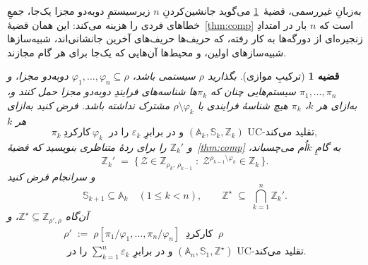 \documentclass[10pt,oneside,openany]{book}
\newcommand{\Zenv}{\mathcal{Z}}
\newcommand{\Aset}{\mathbb{A}}
\newcommand{\SimSet}{\mathbb{S}}
\newcommand{\ZenvSet}{\mathbb{Z}}
\theoremstyle{accentdef}
\theoremstyle{accentplain}
\newtheorem{theorem}[definition]{قضیه}
\begin{document}
به‌زبانِ غیررسمی، قضیهٔ~\ref{thm:parcomp} می‌گوید جانشین‌کردنِ $n$
زیرسیستمِ دوبه‌دو مجزا یک‌جا، جمعِ خطاهای فردی را هزینه می‌کند: این همان
قضیهٔ~\ref{thm:comp} است که $n$ بار در امتدادِ زنجیره‌ای از دورگه‌ها به کار
رفته، که حریف‌ها حریف‌های آخرین جانشانی‌اند، شبیه‌سازها شبیه‌سازهای اولین،
و محیط‌ها آن‌هایی که یک‌جا برای هر گام مجازند.

\begin{theorem}[ترکیبِ موازی]\label{thm:parcomp}
بگذارید $\rho$ سیستمی باشد، $\varphi_1,\dots,\varphi_n \subseteq \rho$
دوبه‌دو مجزا، و $\pi_1,\dots,\pi_n$ سیستم‌هایی چنان که $\pi_k$ها
شناسه‌های فرایندِ دوبه‌دو مجزا حمل کنند و، به‌ازای هر $k$، $\pi_k$ هیچ
شناسهٔ فرایندی با $\rho \setminus \varphi_k$ مشترک نداشته باشد. فرض کنید
به‌ازای هر $k$
\[
  \pi_k \ \text{کارکردِ} \ \varphi_k \ \text{ را در } \varepsilon_k \text{ و در برابرِ } (\Aset_k,\SimSet_k,\ZenvSet_k) \text{ UC-تقلید می‌کند} ,
\]
و $\ZenvSet_k'$ را برای ردهٔ متناظری بنویسید که قضیهٔ~\ref{thm:comp} به
گامِ $k$اُم می‌چسباند،
\[
  \ZenvSet_k' \;=\; \bigl\{\, \Zenv \in \ZenvSet_{\rho_k,\,\rho_{k-1}} \;:\; \Zenv^{\rho_{k-1} \setminus \varphi_k} \in \ZenvSet_k \,\bigr\} .
\]
و سرانجام فرض کنید
\[
  \SimSet_{k+1} \subseteq \Aset_k \quad (1 \leq k < n),
  \qquad
  \ZenvSet^{\star} \;\subseteq\; \bigcap_{k=1}^{n} \ZenvSet_k' .
\]
آن‌گاه $\ZenvSet^{\star} \subseteq \ZenvSet_{\rho',\rho}$، و
\[
  \begin{gathered}
  \rho' \;:=\; \rho[\pi_1/\varphi_1,\dots,\pi_n/\varphi_n]
  \ \text{ کارکردِ } \ \rho \\[3pt]
  \text{ را در } \sum_{k=1}^{n} \varepsilon_k
  \text{ و در برابرِ } (\Aset_n,\SimSet_1,\ZenvSet^{\star}) \text{ UC-تقلید می‌کند} .
  \end{gathered}
\]
\end{theorem}
\end{document}
